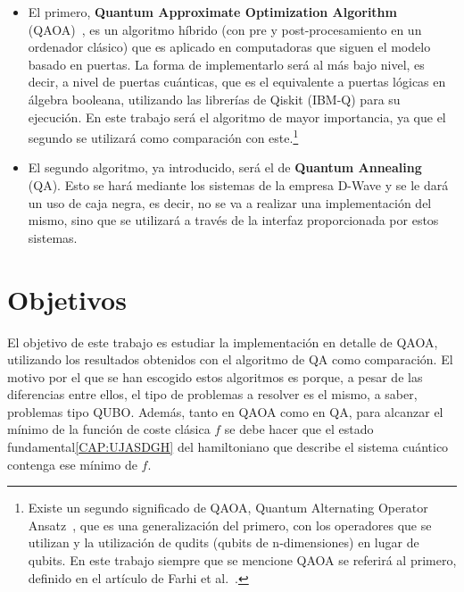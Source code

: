 \begin{itemize}
\item El primero, \textbf{Quantum Approximate Optimization Algorithm} (QAOA)~\cite{qaoa_paper_original}, es un algoritmo híbrido (con pre y post-procesamiento en un ordenador clásico) que es aplicado en computadoras que siguen el modelo basado en puertas.
  La forma de implementarlo será al más bajo nivel, es decir, a nivel de puertas cuánticas, que es el equivalente a puertas lógicas en álgebra booleana, utilizando las librerías de Qiskit (IBM-Q) para su ejecución.
  En este trabajo será el algoritmo de mayor importancia, ya que el segundo se utilizará como comparación con este.\footnote{
    Existe un segundo significado de QAOA, Quantum Alternating Operator Ansatz~\cite{quantum_alternating_operator_ansatz}, que es una generalización del primero, con los operadores que se utilizan y la utilización de qudits (qubits de n-dimensiones) en lugar de qubits.
    En este trabajo siempre que se mencione QAOA se referirá al primero, definido en el artículo de Farhi et al.~\cite{qaoa_paper_original}.
  }

\item El segundo algoritmo, ya introducido, será el de \textbf{Quantum Annealing} (QA).
  Esto se hará mediante los sistemas de la empresa D-Wave y se le dará un uso de caja negra, es decir, no se va a realizar una implementación del mismo, sino que se utilizará a través de la interfaz proporcionada por estos sistemas.
\end{itemize}

\section{Objetivos}

El objetivo de este trabajo es estudiar la implementación en detalle de QAOA, utilizando los resultados obtenidos con el algoritmo de QA como comparación.
El motivo por el que se han escogido estos algoritmos es porque, a pesar de las diferencias entre ellos, el tipo de problemas a resolver es el mismo, a saber, problemas tipo QUBO\@.
Además, tanto en QAOA como en QA, para alcanzar el mínimo de la función de coste clásica $f$ se debe hacer que el estado fundamental\ref{CAP:UJASDGH}  %
del hamiltoniano que describe el sistema cuántico contenga ese mínimo de $f$.



